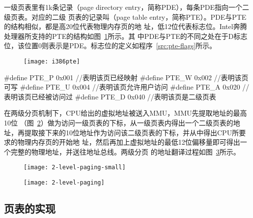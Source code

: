 \documentclass{swfuthesism}
\begin{document}
一级页表里有1k条记录（page directory entry，简称PDE），每条PDE指向一个二级页表。对应的二级
页表的记录叫（page table entry，简称PTE）。PDE与PTE的结构相似，都是高20位代表物理内存页的地
址，低12位代表标志位。Intel奔腾处理器所支持的PTE的结构如图~\ref{fig:i386pte}所示。其
中PDE与PTE的不同之处在于D标志位，该位置0则表示是PDE。标志位的定义如程序~\ref{src:pte-flags}所示。

\begin{figure}[!ht]
  \centering
  \texttt{[image: i386pte]}
  \label{fig:i386pte}
\end{figure}

\begin{listing}%
  \begin{codeblock}
\begin{ccode}
#define PTE_P 0x001 //表明该页已经映射
#define PTE_W 0x002 //表明该页可写
#define PTE_U 0x004 //表明该页允许用户访问
#define PTE_A 0x020 //表明该页已经被访问过
#define PTE_D 0x040 //表明该页是二级页表
\end{ccode}
  \end{codeblock}
  \label{src:pte-flags}
\end{listing}

在两级分页机制下，CPU给出的虚拟地址被送入MMU，MMU先提取地址的最高10位
（图~\ref{fig:2levelpagingsmall}）做为访问一级页表的下标，从一级页表内得出一个二级页表的地
址，再提取接下来的10位地址作为访问该二级页表的下标，并从中得出CPU所要求的物理内存页的开始地
址，然后再加上虚拟地址的最低12位偏移量即可得出一个完整的物理地址，并送往地址总线。两级分页
的地址翻译过程如图~\ref{fig:2levelpaging}所示。

\begin{figure}[!ht]
  \centering
  \texttt{[image: 2-level-paging-small]}
  \label{fig:2levelpagingsmall}
\end{figure}

\begin{figure}[!ht]
  \centering
  \texttt{[image: 2-level-paging]}
  \label{fig:2levelpaging}
\end{figure}

\subsection{页表的实现}
\end{document}
